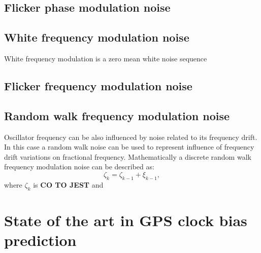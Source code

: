 \subsection{Flicker phase modulation noise}


\subsection{White frequency modulation noise}
White frequency modulation is a zero mean white noise sequence 

\subsection{Flicker frequency modulation noise}

\subsection{Random walk frequency modulation noise}
Oscillator frequency can be also influenced by noise related to its frequency drift.
In this case a random walk noise can be used to represent influence of frequency drift
variations on fractional frequency.
Mathematically a discrete random walk frequency modulation noise can be described as:
\begin{equation}
	\label{equ:rwfm}
	\zeta_{k} = \zeta_{k-1} + \xi_{k-1},
\end{equation}
where $\zeta_{k}$ is \textbf{CO TO JEST} and



\section{State of the art in GPS clock bias prediction}

